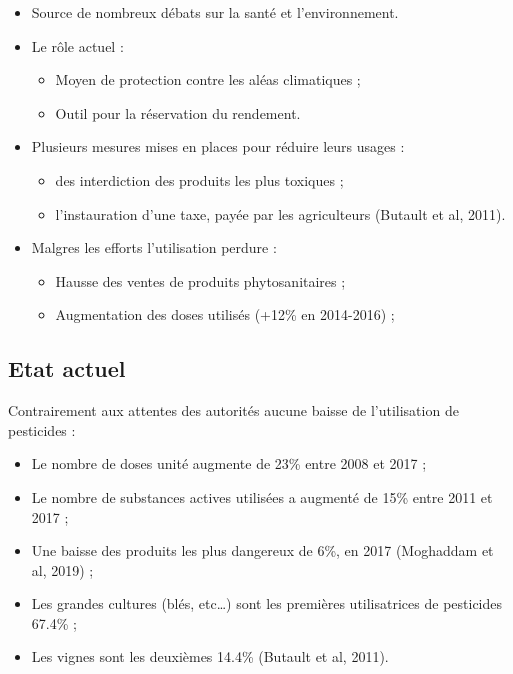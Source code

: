\documentclass[11pt,]{article}
\providecommand{\tightlist}{%
  \setlength{\itemsep}{0pt}\setlength{\parskip}{0pt}}
\begin{document}
\begin{itemize}
\tightlist
\item
  Source de nombreux débats sur la santé et l'environnement.
\item
  Le rôle actuel :

  \begin{itemize}
  \tightlist
  \item
    Moyen de protection contre les aléas climatiques ;
  \item
    Outil pour la réservation du rendement.
  \end{itemize}
\item
  Plusieurs mesures mises en places pour réduire leurs usages :

  \begin{itemize}
  \tightlist
  \item
    des interdiction des produits les plus toxiques ;
  \item
    l'instauration d'une taxe, payée par les agriculteurs (Butault et
    al, 2011).
  \end{itemize}
\item
  Malgres les efforts l'utilisation perdure :

  \begin{itemize}
  \tightlist
  \item
    Hausse des ventes de produits phytosanitaires ;
  \item
    Augmentation des doses utilisés (+12\% en 2014-2016) ;
  \end{itemize}
\end{itemize}

\hypertarget{etat-actuel}{%
\subsection{Etat actuel}\label{etat-actuel}}

Contrairement aux attentes des autorités aucune baisse de l'utilisation
de pesticides :

\begin{itemize}
\tightlist
\item
  Le nombre de doses unité augmente de 23\% entre 2008 et 2017 ;
\item
  Le nombre de substances actives utilisées a augmenté de 15\% entre
  2011 et 2017 ;
\item
  Une baisse des produits les plus dangereux de 6\%, en 2017 (Moghaddam
  et al, 2019) ;
\item
  Les grandes cultures (blés, etc\ldots{}) sont les premières
  utilisatrices de pesticides 67.4\% ;
\item
  Les vignes sont les deuxièmes 14.4\% (Butault et al, 2011).
\end{itemize}
\end{document}
